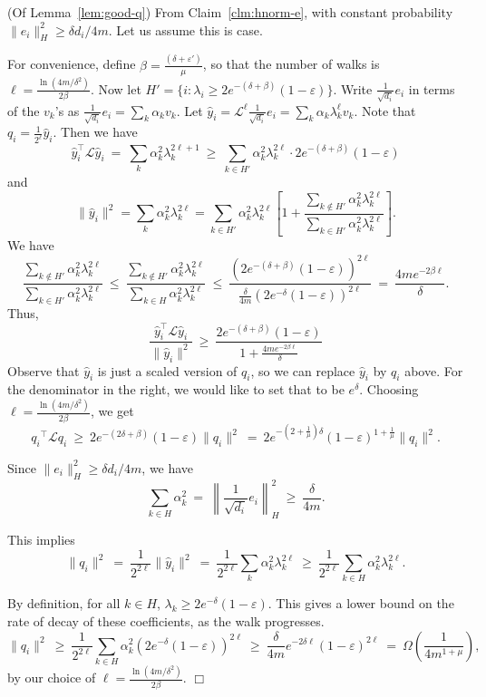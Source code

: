\documentclass[11pt]{article}
\newenvironment{myproof}{\noindent {\sc Proof:}}{$\Box$}
\def\epsilon{\varepsilon}
\def\lap{{\mathcal L}}
\newcommand\qi{q_i}
\newcommand\qhi{\widehat{y}_i}
\begin{document}
\begin{myproof}(Of Lemma~\ref{lem:good-q})
From Claim~\ref{clm:hnorm-e}, with constant probability $\|e_i\|_H^2 \geq \delta d_i/4m$. Let us assume this is case.

For convenience, define $\beta = \frac{(\delta + \epsilon')}{\mu}$, so that the number of walks is $\ell = \frac{\ln(4m/\delta^2)}{2\beta}$.  Now let $H' = \{i: \lambda_i \geq 2e^{-(\delta + \beta)}(1-\epsilon)\}$.
Write $\frac{1}{\sqrt{d_i}}e_i$ in terms of the $v_k$'s as
$\frac{1}{\sqrt{d_i}}e_i = \sum_k \alpha_k v_k$. Let $\qhi = \lap^\ell
\frac{1}{\sqrt{d_i}}e_i = \sum_k \alpha_k \lambda_k^\ell v_k$. Note that $\qi = \frac{1}{2^\ell}\qhi$. Then we have
$$\qhi^\top \lap \qhi\ =\ \sum_k \alpha_k^2 \lambda_k^{2\ell+1}\ \geq\ \sum_{k
\in H'} \alpha_k^2 \lambda_k^{2\ell} \cdot
2e^{-(\delta + \beta)}(1-\epsilon)$$
and
$$\|\qhi\|^2 = \sum_k \alpha_k^2
\lambda_k^{2\ell} = \sum_{k \in H'} \alpha_k^2 \lambda_k^{2\ell}\left[1 +
\frac{\sum_{k \notin H'} \alpha_k^2 \lambda_k^{2\ell}}{\sum_{k \in H'}
\alpha_k^2 \lambda_k^{2\ell}}\right].$$
We have
$$\frac{\sum_{k \notin H'} \alpha_k^2 \lambda_k^{2\ell}}{\sum_{k \in H'} \alpha_k^2
\lambda_k^{2\ell}}\ \leq\ \frac{\sum_{k \notin H'} \alpha_k^2 \lambda_k^{2\ell}}{\sum_{k \in H} \alpha_k^2
\lambda_k^{2\ell}}\ \leq\ \frac{(2e^{-(\delta + \beta)}(1-\epsilon))^{2\ell}}{\frac{\delta}{4m}(2e^{-\delta}(1-\epsilon))^{2\ell}}\ =\ \frac{4m e^{-2\beta\ell}}{\delta}.$$
Thus,
$$\frac{\qhi^\top \lap \qhi}{\|\qhi\|^2}\ \geq\ \frac{2e^{-(\delta + \beta)}(1-\epsilon)}{1 +
\frac{4m e^{-2\beta\ell}}{\delta}}$$
Observe that $\qhi$ is just a scaled version of $\qi$, so we
can replace $\qhi$ by $\qi$ above. For the denominator in the right,
we would like to set that to be $e^\delta$. Choosing
$\ell = \frac{\ln(4m/\delta^2)}{2\beta}$, we get
$$ {\qi}^\top \lap {\qi}\ \geq\ 2e^{-(2\delta + \beta)}(1 - \epsilon)\|{\qi}\|^2\ =\ 2e^{-(2 + \frac{1}{\mu})\delta}(1-\epsilon)^{1 + \frac{1}{\mu}}\|\qi\|^2.$$


Since $\|e_i\|_H^2 \geq \delta d_i/4m$, we have
$$\sum_{k \in H} \alpha_k^2\ =\ \left\|\frac{1}{\sqrt{d_i}}e_i\right\|_H^2\ \geq\ \frac{\delta}{4m}.$$

This implies
$$\|q_i\|^2\ =\ \frac{1}{2^{2\ell}}\|\qhi\|^2\ =\ \frac{1}{2^{2\ell}}\sum_k \alpha_k^2 \lambda_k^{2\ell}\ \geq\ \frac{1}{2^{2\ell}}\sum_{k \in H} \alpha_k^2\lambda_k^{2\ell}.$$

By definition, for all $k \in H$, $\lambda_k \geq 2e^{-\delta}(1-\epsilon)$.
This gives a lower bound on the rate of decay of these coefficients,
as the walk progresses.
$$ \|q_i\|^2\ \geq\ \frac{1}{2^{2\ell}}\sum_{k \in H}\alpha_k^2 (2e^{-\delta}(1-\epsilon))^{2\ell}\ \geq\ \frac{\delta}{4m} e^{-2\delta \ell}(1-\epsilon)^{2\ell}\ =\ \Omega\left(\frac{1}{4m^{1+\mu}}\right),$$
by our choice of $\ell = \frac{\ln(4m/\delta^2)}{2\beta}$.
\end{myproof}
\end{document}
